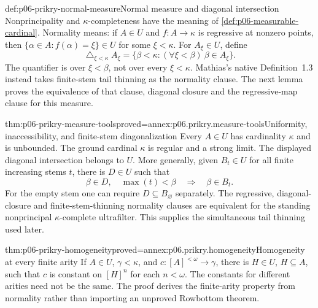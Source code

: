 \begin{hbdefinition}{def:p06-prikry-normal-measure}{Normal measure and diagonal intersection}
Nonprincipality and \(\kappa\)-completeness have the meaning of
\cref{def:p06-measurable-cardinal}. Normality means: if \(A\in U\) and
\(f:A\to\kappa\) is regressive at nonzero points, then
\(\{\alpha\in A:f(\alpha)=\xi\}\in U\) for some \(\xi<\kappa\).
For \(A_\xi\in U\), define
\[
 \mathop{\triangle}_{\xi<\kappa}A_\xi
 =\{\beta<\kappa:(\forall\xi<\beta)\ \beta\in A_\xi\}.
\]
The quantifier is over \(\xi<\beta\), not over every \(\xi<\kappa\).
Mathias's native Definition~1.3 instead takes finite-stem tail thinning
as the normality clause. The next lemma proves the equivalence of that
clause, diagonal closure and the regressive-map clause for this measure.
\end{hbdefinition}

\begin{hblemma}{thm:p06-prikry-measure-tools}{proved=annex:p06.prikry.measure-tools}{Uniformity, inaccessibility, and finite-stem diagonalization}
Every \(A\in U\) has cardinality \(\kappa\) and is unbounded.
The ground cardinal \(\kappa\) is regular and a strong limit.
The displayed diagonal intersection belongs to \(U\). More generally,
given \(B_t\in U\) for all finite increasing stems \(t\), there is
\(D\in U\) such that
\[
 \beta\in D,\quad \max(t)<\beta
       \quad\Longrightarrow\quad \beta\in B_t.
\]
For the empty stem one can require \(D\subseteq B_{\varnothing}\)
separately. The regressive, diagonal-closure and finite-stem-thinning
normality clauses are equivalent for the standing nonprincipal
\(\kappa\)-complete ultrafilter. This supplies the simultaneous tail
thinning used later.
\end{hblemma}

\begin{hblemma}{thm:p06-prikry-homogeneity}{proved=annex:p06.prikry.homogeneity}{Homogeneity at every finite arity}
If \(A\in U\), \(\gamma<\kappa\), and
\(c:[A]^{<\omega}\to\gamma\), there is \(H\in U\), \(H\subseteq A\),
such that \(c\) is constant on \([H]^n\) for each \(n<\omega\).
The constants for different arities need not be the same. The proof
derives the finite-arity property from normality rather than importing
an unproved Rowbottom theorem.
\end{hblemma}

